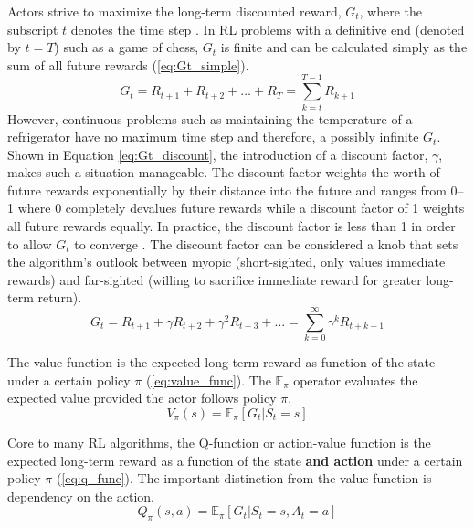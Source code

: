 Actors strive to maximize the long-term discounted reward, $G_t$, where the subscript $t$ denotes the time step \cite{sutton_2017}. In RL problems with a definitive end (denoted by $t=T$) such as a game of chess, $G_t$ is finite and can be calculated simply as the sum of all future rewards (\ref{eq:Gt_simple}). 
\begin{equation}
	\label{eq:Gt_simple}
	G_t=R_{t+1}+R_{t+2}+\dots + R_{T}=\sum_{k=t}^{T-1} R_{k+1}
\end{equation}
However, continuous problems such as maintaining the temperature of a refrigerator have no maximum time step and therefore, a possibly infinite $G_t$. Shown in Equation \ref{eq:Gt_discount}, the introduction of a discount factor, $\gamma$, makes such a situation manageable. The discount factor weights the worth of future rewards exponentially by their distance into the future and ranges from 0--1 where 0 completely devalues future rewards while a discount factor of 1 weights all future rewards equally. In practice, the discount factor is less than 1 in order to allow $G_t$ to converge \cite{sutton_2017}. The discount factor can be considered a knob that sets the algorithm's outlook between myopic (short-sighted, only values immediate rewards) and far-sighted (willing to sacrifice immediate reward for greater long-term return).
\begin{equation}
\label{eq:Gt_discount}
	G_t=R_{t+1}+\gamma R_{t+2}+\gamma^2 R_{t+3} + \dots = \sum_{k=0}^{\infty} \gamma^k R_{t+k+1}
\end{equation}

The value function is the expected long-term reward as function of the state under a certain policy $\pi$ (\ref{eq:value_func}). The $\mathbb{E}_\pi$ operator evaluates the expected value provided the actor follows policy $\pi$.
\begin{equation}
	\label{eq:value_func}
	V_\pi(s)=\mathbb{E}_\pi [G_t | S_t =s]
\end{equation}

Core to many RL algorithms, the Q-function or action-value function is the expected long-term reward as a function of the state \textbf{and action} under a certain policy $\pi$ (\ref{eq:q_func}). The important distinction from the value function is dependency on the action. 
\begin{equation}
	\label{eq:q_func}
	Q_\pi(s,a)=\mathbb{E}_\pi [G_t | S_t =s, A_t=a]
\end{equation}


